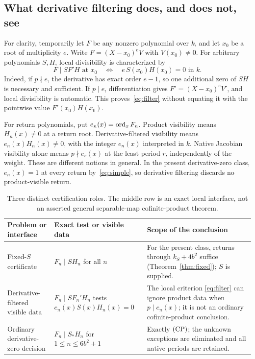 \subsection{What derivative filtering does, and does not, see}

For clarity, temporarily let $F$ be any nonzero polynomial over
$k$, and let $x_0$ be a root of multiplicity $e$. Write
$F=(X-x_0)^eV$ with $V(x_0)\ne0$. For arbitrary polynomials
$S,H$, local divisibility is characterized by
\begin{equation}\label{eq:filter}
 F\mid SF'H\text{ at }x_0
 \quad\Longleftrightarrow\quad e\,S(x_0)H(x_0)=0\text{ in }k.
\end{equation}
Indeed, if $p\nmid e$, the derivative has exact order $e-1$,
so one additional zero of $SH$ is necessary and sufficient. If
$p\mid e$, differentiation gives $F'=(X-x_0)^eV'$, and local
divisibility is automatic. This proves~\eqref{eq:filter} without
equating it with the pointwise value $F'(x_0)H(x_0)$.

For return polynomials, put $e_n(x)=\operatorname{ord}_x F_n$. Product visibility
means $H_n(x)\ne0$ at a return root. Derivative-filtered visibility
means $e_n(x)H_n(x)\ne0$, with the integer $e_n(x)$ interpreted
in $k$. Native Jacobian visibility alone means $p\nmid e_r(x)$
at the least period $r$, independently of the weight. These are
different notions in general. In the present derivative-zero
class, $e_n(x)=1$ at every return by~\eqref{eq:simple}, so
derivative filtering discards no product-visible return.

\begin{table}[t]
\centering
\small
\begin{tabularx}{\textwidth}{@{}>{\raggedright\arraybackslash}p{}
  >{\raggedright\arraybackslash}X>{\raggedright\arraybackslash}X@{}}
\toprule
Problem or interface & Exact test or visible data & Scope of the conclusion \\
\midrule
Fixed-$S$ certificate & $F_n\mid SH_n$ for all $n$ &
For the present class, returns through $k_S+4b^2$ suffice
(Theorem~\ref{thm:fixed}); $S$ is supplied. \\
Derivative-filtered visible data & $F_n\mid SF_n'H_n$ tests
$e_n(x)S(x)H_n(x)=0$ & The local criterion
\eqref{eq:filter} can ignore product data when $p\mid e_n(x)$;
it is not an ordinary cofinite-product conclusion. \\
Ordinary derivative-zero decision & $F_n\mid S_*H_n$ for
$1\le n\le6b^2+1$ & Exactly $\mathrm{(CP)}$; the unknown exceptions
are eliminated and all native periods are retained. \\
\bottomrule
\end{tabularx}
\caption{Three distinct certification roles. The middle row is an
exact local interface, not an asserted general separable-map
cofinite-product theorem.}\label{tab:comparison}
\end{table}

